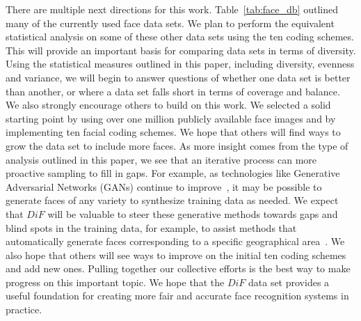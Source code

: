 \documentclass[letterpaper,11pt]{article}
\begin{document}
There are multiple next directions for this work.  Table~\ref{tab:face_db} outlined many of the currently used face data sets.  We plan to perform the equivalent statistical analysis on some of these other data sets using the ten coding schemes.  This will provide an important basis for comparing data sets in terms of diversity.  Using the statistical measures outlined in this paper, including diversity, evenness and variance, we will begin to answer questions of whether one data set is better than another, or where a data set falls short in terms of coverage and balance.  We also strongly encourage others to build on this work.  We selected a solid starting point by using over one million publicly available face images and by implementing ten facial coding schemes.  We hope that others will find ways to grow the data set to include more faces.  As more insight comes from the type of analysis outlined in this paper, we see that an iterative process can more proactive sampling to fill in gaps.  For example, as technologies like Generative Adversarial Networks (GANs) continue to improve~\cite{progressiveGAN_ICLR18,faceid_gan18}, it may be possible to generate faces of any variety to synthesize training data as needed.  We expect that $DiF$ will be valuable to steer these generative methods towards gaps and blind spots in the training data, for example, to assist methods that automatically generate faces corresponding to a specific geographical area~\cite{bessinger_wacv19}.   We also hope that others will see ways to improve on the initial ten coding schemes and add new ones.  Pulling together our collective efforts is the best way to make progress on this important topic.  We hope that the $DiF$ data set provides a useful foundation for creating more fair and accurate face recognition systems in practice.
\clearpage


\end{document}
